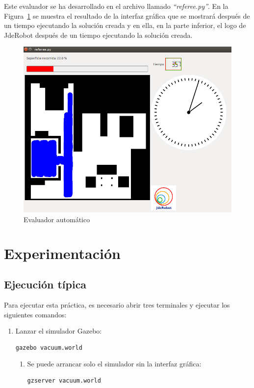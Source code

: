 Este evaluador se ha desarrollado en el archivo llamado \textit{``referee.py''}. En la Figura~\ref{fig.referee} se muestra el resultado de la interfaz gráfica que se mostrará después de un tiempo ejecutando la solución creada y en ella, en la parte inferior, el logo de JdeRobot después de un tiempo ejecutando la solución creada.

\begin{figure}[H]
  \begin{center}
    \includegraphics[width=1.0\textwidth]{figures/Vacuum/refereeTiempo.png}
		\caption{Evaluador automático}
		\label{fig.referee}
		\end{center}
\end{figure}



\section{Experimentación} 

\subsection{Ejecución típica}
Para ejecutar esta práctica, es necesario abrir tres terminales y ejecutar los siguientes comandos:

\begin{enumerate}[1.]
\item Lanzar el simulador Gazebo:
	\begin{lstlisting}[frame=single]
		gazebo vacuum.world
	\end{lstlisting} 
	\begin{enumerate}[1b.]
	\item Se puede arrancar solo el simulador sin la interfaz gráfica:
		\begin{lstlisting}[frame=single]
		 	gzserver vacuum.world
		\end{lstlisting}
	\end{enumerate}
\end{enumerate}

